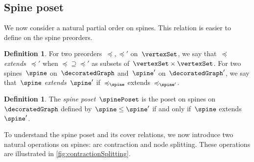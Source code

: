 \documentclass{amsart}
\theoremstyle{definition}
\newtheorem{definition}[theorem]{Definition}
\newcommand{\darkblue}{\color{darkblue}} %
\newcommand{\defn}[1]{\textsl{\darkblue #1}} %
\begin{document}

\subsection{Spine poset}
\label{subsec:spinePoset}

We now consider a natural partial order on spines.
This relation is easier to define on the spine preorders.

\begin{definition}
  \label{def:extensionPreorders}
  For two preorders~$\preccurlyeq, \preccurlyeq'$ on~$\vertexSet$, we say that~$\preccurlyeq$ \defn{extends}~$\preccurlyeq'$ when ${\preccurlyeq} \supseteq {\preccurlyeq'}$ as subsets of~$\vertexSet \times \vertexSet$.
  For two spines~$\spine$ on~$\decoratedGraph$ and~$\spine'$ on~$\decoratedGraph'$, we say that~$\spine$ \defn{extends}~$\spine'$ if~$\preccurlyeq_{\spine}$ extends~$\preccurlyeq_{\spine'}$.
\end{definition}

\begin{definition}
  \label{def:spinePoset}
  The \defn{spine poset}~$\spinePoset$ is the poset on spines on~$\decoratedGraph$ defined by~$\spine \le \spine'$ if and only if~$\spine$ extends~$\spine'$.
\end{definition}

To understand the spine poset and its cover relations, we now introduce two natural operations on spines: arc contraction and node splitting.
These operations are illustrated in \cref{fig:contractionSplitting}.
\end{document}
